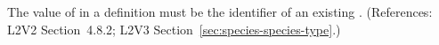 The value of  in a \Species definition must be the
identifier of an existing \SpeciesType.  (References: L2V2
Section~4.8.2; L2V3 Section~\ref{sec:species-species-type}.)
